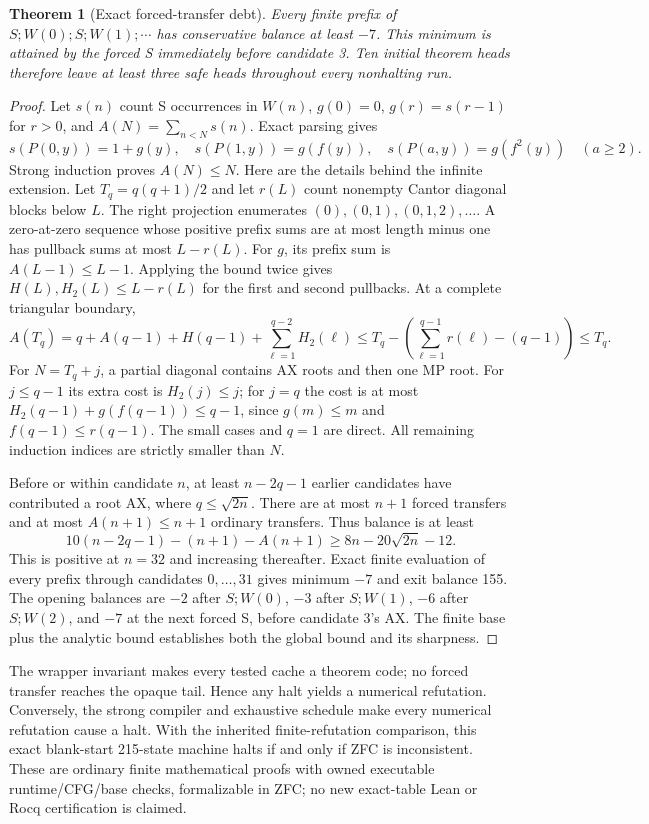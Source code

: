\documentclass[11pt]{article}
\newtheorem{theorem}{Theorem}
\begin{document}
\begin{theorem}[Exact forced-transfer debt]
Every finite prefix of $S;W(0);S;W(1);\cdots$ has conservative balance at least $-7$. This minimum is attained by the forced S immediately before candidate 3. Ten initial theorem heads therefore leave at least three safe heads throughout every nonhalting run.
\end{theorem}
\begin{proof}
Let $s(n)$ count S occurrences in $W(n)$, $g(0)=0$, $g(r)=s(r-1)$ for $r>0$, and $A(N)=\sum_{n<N}s(n)$. Exact parsing gives
\[
 s(P(0,y))=1+g(y),\quad s(P(1,y))=g(f(y)),\quad
 s(P(a,y))=g(f^2(y))\quad(a\ge2).
\]
Strong induction proves $A(N)\le N$. Here are the details behind the infinite extension. Let $T_q=q(q+1)/2$ and let $r(L)$ count nonempty Cantor diagonal blocks below $L$. The right projection enumerates $(0),(0,1),(0,1,2),\ldots$. A zero-at-zero sequence whose positive prefix sums are at most length minus one has pullback sums at most $L-r(L)$. For $g$, its prefix sum is $A(L-1)\le L-1$. Applying the bound twice gives $H(L),H_2(L)\le L-r(L)$ for the first and second pullbacks. At a complete triangular boundary,
\[
 A(T_q)=q+A(q-1)+H(q-1)+\sum_{\ell=1}^{q-2}H_2(\ell)
 \le T_q-\left(\sum_{\ell=1}^{q-1}r(\ell)-(q-1)\right)\le T_q.
\]
For $N=T_q+j$, a partial diagonal contains AX roots and then one MP root. For $j\le q-1$ its extra cost is $H_2(j)\le j$; for $j=q$ the cost is at most $H_2(q-1)+g(f(q-1))\le q-1$, since $g(m)\le m$ and $f(q-1)\le r(q-1)$. The small cases and $q=1$ are direct. All remaining induction indices are strictly smaller than $N$.

Before or within candidate $n$, at least $n-2q-1$ earlier candidates have contributed a root AX, where $q\le\sqrt{2n}$. There are at most $n+1$ forced transfers and at most $A(n+1)\le n+1$ ordinary transfers. Thus balance is at least
\[
 10(n-2q-1)-(n+1)-A(n+1)\ge8n-20\sqrt{2n}-12.
\]
This is positive at $n=32$ and increasing thereafter. Exact finite evaluation of every prefix through candidates $0,\ldots,31$ gives minimum $-7$ and exit balance 155. The opening balances are $-2$ after $S;W(0)$, $-3$ after $S;W(1)$, $-6$ after $S;W(2)$, and $-7$ at the next forced S, before candidate 3's AX. The finite base plus the analytic bound establishes both the global bound and its sharpness.
\end{proof}

The wrapper invariant makes every tested cache a theorem code; no forced transfer reaches the opaque tail. Hence any halt yields a numerical refutation. Conversely, the strong compiler and exhaustive schedule make every numerical refutation cause a halt. With the inherited finite-refutation comparison, this exact blank-start 215-state machine halts if and only if ZFC is inconsistent. These are ordinary finite mathematical proofs with owned executable runtime/CFG/base checks, formalizable in ZFC; no new exact-table Lean or Rocq certification is claimed.
\end{document}

